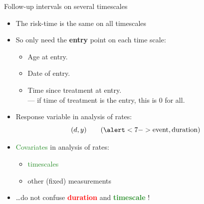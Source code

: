\begin{frame}[fragile]{Follow-up intervals on several timescales}
  \begin{itemize}[<+->]
  \item The risk-time is the same on all timescales
  \item So only need the \textbf{entry} point on each time scale:

  \begin{itemize}
    \item Age at entry.
    \item Date of entry.
    \item Time since treatment at entry.\\
          --- if time of treatment is the entry, this is $0$ for all.
  \end{itemize}

  \item \alert<7->{Response variable} in analysis of rates:\\[-1em]
\[ (d,y) \qquad (\alert<7->{\text{event}, \text{duration}}) \]

  \item \textcolor{forestgreen}{Covariates} in analysis of rates:

  \begin{itemize}[<+->]
    \item \textcolor{forestgreen}{timescales}
    \item other (fixed) measurements
  \end{itemize}
\item \ldots do not confuse  \textcolor{red}{\textbf{duration}} and
                     \textcolor{forestgreen}{\textbf{timescale}} !
  \end{itemize}
\end{frame}

